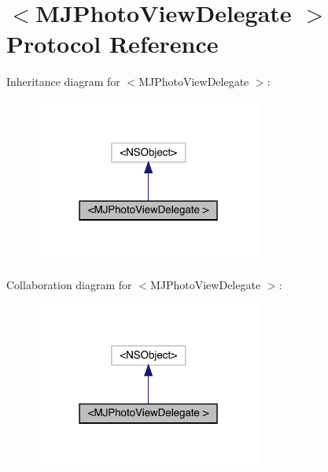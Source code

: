 \hypertarget{protocol_m_j_photo_view_delegate_01-p}{}\section{$<$M\+J\+Photo\+View\+Delegate $>$ Protocol Reference}
\label{protocol_m_j_photo_view_delegate_01-p}


Inheritance diagram for $<$M\+J\+Photo\+View\+Delegate $>$\+:\nopagebreak
\begin{figure}[H]
\begin{center}
\leavevmode
\includegraphics[width=211pt]{protocol_m_j_photo_view_delegate_01-p__inherit__graph}
\end{center}
\end{figure}


Collaboration diagram for $<$M\+J\+Photo\+View\+Delegate $>$\+:\nopagebreak
\begin{figure}[H]
\begin{center}
\leavevmode
\includegraphics[width=211pt]{protocol_m_j_photo_view_delegate_01-p__coll__graph}
\end{center}
\end{figure}
